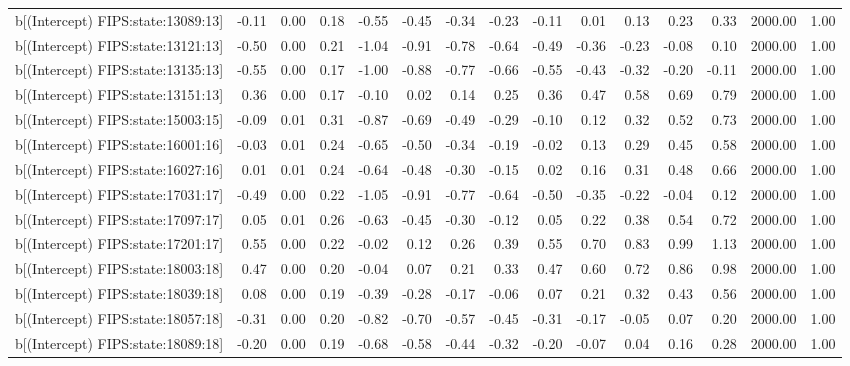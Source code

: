 \begin{table}[ht]
\begin{tabular}{rrrrrrrrrrrrrrr}
  b[(Intercept) FIPS:state:13089:13] & -0.11 & 0.00 & 0.18 & -0.55 & -0.45 & -0.34 & -0.23 & -0.11 & 0.01 & 0.13 & 0.23 & 0.33 & 2000.00 & 1.00 \\ 
  b[(Intercept) FIPS:state:13121:13] & -0.50 & 0.00 & 0.21 & -1.04 & -0.91 & -0.78 & -0.64 & -0.49 & -0.36 & -0.23 & -0.08 & 0.10 & 2000.00 & 1.00 \\ 
  b[(Intercept) FIPS:state:13135:13] & -0.55 & 0.00 & 0.17 & -1.00 & -0.88 & -0.77 & -0.66 & -0.55 & -0.43 & -0.32 & -0.20 & -0.11 & 2000.00 & 1.00 \\ 
  b[(Intercept) FIPS:state:13151:13] & 0.36 & 0.00 & 0.17 & -0.10 & 0.02 & 0.14 & 0.25 & 0.36 & 0.47 & 0.58 & 0.69 & 0.79 & 2000.00 & 1.00 \\ 
  b[(Intercept) FIPS:state:15003:15] & -0.09 & 0.01 & 0.31 & -0.87 & -0.69 & -0.49 & -0.29 & -0.10 & 0.12 & 0.32 & 0.52 & 0.73 & 2000.00 & 1.00 \\ 
  b[(Intercept) FIPS:state:16001:16] & -0.03 & 0.01 & 0.24 & -0.65 & -0.50 & -0.34 & -0.19 & -0.02 & 0.13 & 0.29 & 0.45 & 0.58 & 2000.00 & 1.00 \\ 
  b[(Intercept) FIPS:state:16027:16] & 0.01 & 0.01 & 0.24 & -0.64 & -0.48 & -0.30 & -0.15 & 0.02 & 0.16 & 0.31 & 0.48 & 0.66 & 2000.00 & 1.00 \\ 
  b[(Intercept) FIPS:state:17031:17] & -0.49 & 0.00 & 0.22 & -1.05 & -0.91 & -0.77 & -0.64 & -0.50 & -0.35 & -0.22 & -0.04 & 0.12 & 2000.00 & 1.00 \\ 
  b[(Intercept) FIPS:state:17097:17] & 0.05 & 0.01 & 0.26 & -0.63 & -0.45 & -0.30 & -0.12 & 0.05 & 0.22 & 0.38 & 0.54 & 0.72 & 2000.00 & 1.00 \\ 
  b[(Intercept) FIPS:state:17201:17] & 0.55 & 0.00 & 0.22 & -0.02 & 0.12 & 0.26 & 0.39 & 0.55 & 0.70 & 0.83 & 0.99 & 1.13 & 2000.00 & 1.00 \\ 
  b[(Intercept) FIPS:state:18003:18] & 0.47 & 0.00 & 0.20 & -0.04 & 0.07 & 0.21 & 0.33 & 0.47 & 0.60 & 0.72 & 0.86 & 0.98 & 2000.00 & 1.00 \\ 
  b[(Intercept) FIPS:state:18039:18] & 0.08 & 0.00 & 0.19 & -0.39 & -0.28 & -0.17 & -0.06 & 0.07 & 0.21 & 0.32 & 0.43 & 0.56 & 2000.00 & 1.00 \\ 
  b[(Intercept) FIPS:state:18057:18] & -0.31 & 0.00 & 0.20 & -0.82 & -0.70 & -0.57 & -0.45 & -0.31 & -0.17 & -0.05 & 0.07 & 0.20 & 2000.00 & 1.00 \\ 
  b[(Intercept) FIPS:state:18089:18] & -0.20 & 0.00 & 0.19 & -0.68 & -0.58 & -0.44 & -0.32 & -0.20 & -0.07 & 0.04 & 0.16 & 0.28 & 2000.00 & 1.00 \\ 

\end{tabular}
\end{table}
